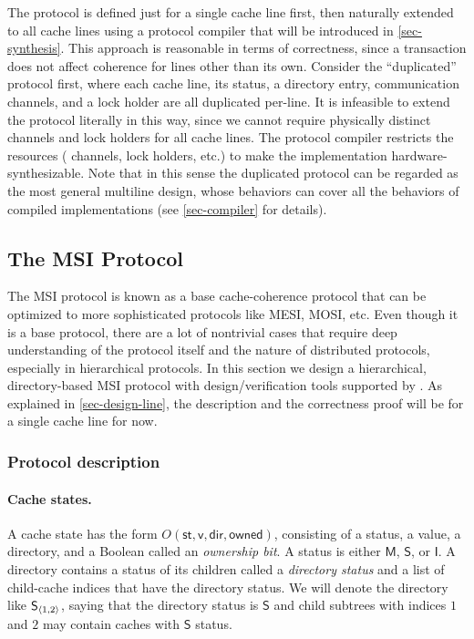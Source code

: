 \documentclass[sigplan,10pt,review,anonymous,screen]{acmart}\settopmatter{printfolios=true,printccs=false,printacmref=false}
\begin{document}
The protocol is defined just for a single cache line first, then naturally extended to all cache lines using a protocol compiler that will be introduced in \autoref{sec-synthesis}.
This approach is reasonable in terms of correctness, since a transaction does not affect coherence for lines other than its own.
Consider the ``duplicated'' protocol first, where each cache line, its status, a directory entry, communication channels, and a lock holder are all duplicated per-line.
It is infeasible to extend the protocol literally in this way, since we cannot require physically distinct channels and lock holders for all cache lines.
The protocol compiler restricts the resources (\eg{} channels, lock holders, etc.) to make the implementation hardware-synthesizable.
Note that in this sense the duplicated protocol can be regarded as the most general multiline design, whose behaviors can cover all the behaviors of compiled implementations (see \autoref{sec-compiler} for details).

\subsection{The MSI Protocol}
\label{sec-msi-protocol}

\newcommand{\mesi}{\ensuremath{\textsf{MESI}}}
\newcommand{\msi}{\ensuremath{\textsf{MSI}}}
\newcommand{\stM}{\ensuremath{\textsf{M}}}
\newcommand{\stE}{\ensuremath{\textsf{E}}}
\newcommand{\stS}{\ensuremath{\textsf{S}}}
\newcommand{\stI}{\ensuremath{\textsf{I}}}
\newcommand{\dir}[2]{\ensuremath{#1_{\tuple{#2}}}}

The MSI protocol is known as a base cache-coherence protocol that can be optimized to more sophisticated protocols like MESI, MOSI, etc.
Even though it is a base protocol, there are a lot of nontrivial cases that require deep understanding of the protocol itself and the nature of distributed protocols, especially in hierarchical protocols.
In this section we design a hierarchical, directory-based MSI protocol with design/verification tools supported by \hemiola{}.
As explained in \autoref{sec-design-line}, the description and the correctness proof will be for a single cache line for now.

\subsubsection{Protocol description}

\paragraph{Cache states.}
A cache state has the form $O(\textsf{st}, \textsf{v}, \textsf{dir}, \textsf{owned})$, consisting of a status, a value, a directory, and a Boolean called an \emph{ownership bit}.
A status is either \stM{}, \stS{}, or \stI{}.
A directory contains a status of its children called a \emph{directory status} and a list of child-cache indices that have the directory status.
We will denote the directory like $\dir{\stS{}}{1, 2}$, saying that the directory status is \stS{} and child subtrees with indices $1$ and $2$ may contain caches with \stS{} status.
\end{document}
